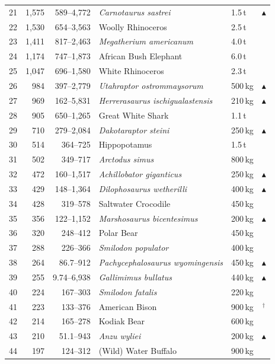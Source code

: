 \documentclass[11pt]{article}
\begin{document}
\begin{longtable}{rrrllc}
21 & 1,575 & 589--4,772 & \textit{Carnotaurus sastrei} & 1.5\,t & $\blacktriangle$ \\
22 & 1,530 & 654--3,563 & Woolly Rhinoceros & 2.5\,t &  \\
23 & 1,411 & 817--2,463 & \textit{Megatherium americanum} & 4.0\,t &  \\
24 & 1,174 & 747--1,873 & African Bush Elephant & 6.0\,t &  \\
25 & 1,047 & 696--1,580 & White Rhinoceros & 2.3\,t &  \\
26 & 984 & 397--2,779 & \textit{Utahraptor ostrommaysorum} & 500\,kg & $\blacktriangle$ \\
27 & 969 & 162--5,831 & \textit{Herrerasaurus ischigualastensis} & 210\,kg & $\blacktriangle$ \\
28 & 905 & 650--1,265 & Great White Shark & 1.1\,t &  \\
29 & 710 & 279--2,084 & \textit{Dakotaraptor steini} & 250\,kg & $\blacktriangle$ \\
30 & 514 & 364--725 & Hippopotamus & 1.5\,t &  \\
31 & 502 & 349--717 & \textit{Arctodus simus} & 800\,kg &  \\
32 & 472 & 160--1,517 & \textit{Achillobator giganticus} & 250\,kg & $\blacktriangle$ \\
33 & 429 & 148--1,364 & \textit{Dilophosaurus wetherilli} & 400\,kg & $\blacktriangle$ \\
34 & 428 & 319--578 & Saltwater Crocodile & 450\,kg &  \\
35 & 356 & 122--1,152 & \textit{Marshosaurus bicentesimus} & 200\,kg & $\blacktriangle$ \\
36 & 320 & 248--412 & Polar Bear & 450\,kg &  \\
37 & 288 & 226--366 & \textit{Smilodon populator} & 400\,kg &  \\
38 & 264 & 86.7--912 & \textit{Pachycephalosaurus wyomingensis} & 450\,kg & $\blacktriangle$ \\
39 & 255 & 9.74--6,938 & \textit{Gallimimus bullatus} & 440\,kg & $\blacktriangle$ \\
40 & 224 & 167--303 & \textit{Smilodon fatalis} & 220\,kg &  \\
41 & 223 & 133--376 & American Bison & 900\,kg & $^{\dagger}$ \\
42 & 214 & 165--278 & Kodiak Bear & 600\,kg &  \\
43 & 210 & 51.1--943 & \textit{Anzu wyliei} & 200\,kg & $\blacktriangle$ \\
44 & 197 & 124--312 & (Wild) Water Buffalo & 900\,kg &  \\

\end{longtable}
\end{document}

